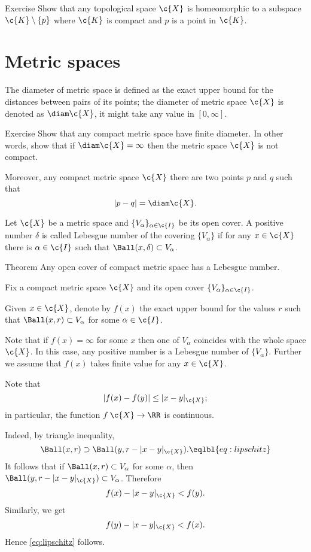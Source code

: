 \begin{thm}{Exercise}
Show that any topological space $\c{X}$ is homeomorphic to a subspace $\c{K}\setminus\{p\}$
where $\c{K}$ is compact and $p$ is a point in $\c{K}$.
\end{thm}

\section{Metric spaces}

The diameter of metric space is defined as the exact upper bound for the distances between pairs of its points;
the diameter of metric space $\c{X}$ is denoted as $\diam \c{X}$, it might take any value in $[0,\infty]$.

\begin{thm}{Exercise}
Show that any compact metric space have finite diameter.
In other words, show that if $\diam\c{X}=\infty$ then the metric space $\c{X}$ is not compact.

Moreover, any compact metric space $\c{X}$ there are two points $p$ and $q$ such that 
\[|p-q|=\diam \c{X}.\]
\end{thm}


Let $\c{X}$ be a metric space and $\{V_\alpha\}_{\alpha\in\c{I}}$ be its open cover.
A positive number $\delta$ is called Lebesgue number of the covering $\{V_\alpha\}$
if for any $x\in \c{X}$ there is $\alpha\in\c{I}$ such that $\Ball(x,\delta)\subset V_\alpha$.

\begin{thm}{Theorem}
Any open cover of compact metric space has a Lebesgue number.
\end{thm}

Fix a compact metric space $\c{X}$ and its open cover $\{V_\alpha\}_{\alpha\in\c{I}}$.

Given $x\in \c{X}$, denote by $f(x)$ the exact upper bound for the values $r$ such that $\Ball(x,r)\subset V_\alpha$ for some $\alpha\in \c{I}$.

Note that if $f(x)=\infty$ for some $x$ then one of $V_\alpha$ coincides with the whole space $\c{X}$.
In this case, any positive number is a Lebesgue number of $\{V_\alpha\}$.
Further we assume that $f(x)$ takes finite value for any $x\in\c{X}$.

Note that 
\[|f(x)-f(y)|\le |x-y|_{\c{X}};\]
in particular, the function $f\:\c{X}\to\RR$ is continuous.

Indeed, by triangle inequality, 
\[\Ball(x,r)\supset \Ball(y,r-|x-y|_{\c{X}}).\eqlbl{eq:lipschitz}\]
It follows that if $\Ball(x,r)\subset V_\alpha$ for some $\alpha$,
then $\Ball(y,r-|x-y|_{\c{X}})\subset V_\alpha$.
Therefore
\[f(x)-|x-y|_{\c{X}}<f(y).\]
Similarly, we get 
\[f(y)-|x-y|_{\c{X}}<f(x).\]
Hence \ref{eq:lipschitz} follows.

